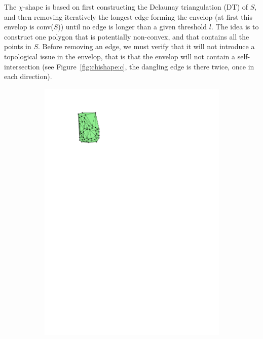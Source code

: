 The $\chi$-shape is based on first constructing the Delaunay triangulation (DT) of $S$, and then removing iteratively the longest edge forming the envelop (at first this envelop is conv($S$)) until no edge is longer than a given threshold $l$.
The idea is to construct one polygon that is potentially non-convex, and that contains all the points in $S$.
Before removing an edge, we must verify that it will not introduce a topological issue in the envelop, that is that the envelop will not contain a self-intersection (see Figure~\ref{fig:chishape:c}, the dangling edge is there twice, once in each direction). 
\begin{figure}
  \centering
  \begin{subfigure}[b]{0.25\linewidth}
    \centering
    \includegraphics[page=1,width=\textwidth]{figs/chishape.pdf}
    \caption{}
    \label{fig:chishape:a}
  \end{subfigure}

\end{figure}
